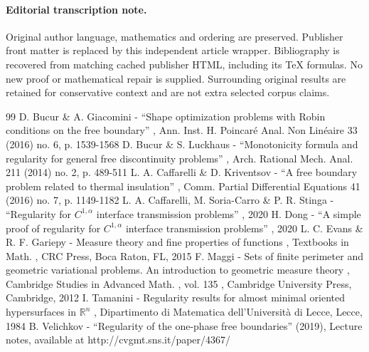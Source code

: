 \documentclass[11pt]{article}
\numberwithin{equation}{section}
\begin{document}
\paragraph{Editorial transcription note.}
Original author language, mathematics and ordering are preserved. Publisher front matter is replaced by this independent article wrapper. Bibliography is recovered from matching cached publisher HTML, including its TeX formulas. No new proof or mathematical repair is supplied. Surrounding original results are retained for conservative context and are not extra selected corpus claims.
\clearpage

\begin{thebibliography}{99}
 D. Bucur \& A. Giacomini - “Shape optimization problems with Robin conditions on the free boundary” , Ann. Inst. H. Poincaré Anal. Non Linéaire 33 (2016) no. 6, p. 1539-1568
 D. Bucur \& S. Luckhaus - “Monotonicity formula and regularity for general free discontinuity problems” , Arch. Rational Mech. Anal. 211 (2014) no. 2, p. 489-511
 L. A. Caffarelli \& D. Kriventsov - “A free boundary problem related to thermal insulation” , Comm. Partial Differential Equations 41 (2016) no. 7, p. 1149-1182
 L. A. Caffarelli, M. Soria-Carro \& P. R. Stinga - “Regularity for $C^{1,\alpha }$ interface transmission problems” , 2020
 H. Dong - “A simple proof of regularity for $C^{1,\alpha }$ interface transmission problems” , 2020
 L. C. Evans \& R. F. Gariepy - Measure theory and fine properties of functions , Textbooks in Math. , CRC Press, Boca Raton, FL, 2015
 F. Maggi - Sets of finite perimeter and geometric variational problems. An introduction to geometric measure theory , Cambridge Studies in Advanced Math. , vol. 135 , Cambridge University Press, Cambridge, 2012
 I. Tamanini - Regularity results for almost minimal oriented hypersurfaces in $\mathbb{R}^n$ , Dipartimento di Matematica dell’Università di Lecce, Lecce, 1984
 B. Velichkov - “Regularity of the one-phase free boundaries” (2019), Lecture notes, available at http://cvgmt.sns.it/paper/4367/
\end{thebibliography}
\end{document}
